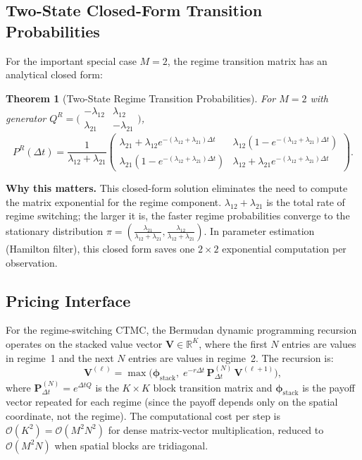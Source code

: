 \documentclass[11pt,a4paper,openany]{book}
\theoremstyle{definition}
\theoremstyle{plain}
\newtheorem{theorem}{Theorem}[chapter]
\theoremstyle{remark}
\newcommand{\1}{\mathbbm{1}}
\newcommand{\R}{\mathbb{R}}
\begin{document}
\subsection{Two-State Closed-Form Transition Probabilities}

For the important special case $M=2$, the regime transition matrix has an analytical closed form:

\begin{theorem}[Two-State Regime Transition Probabilities]
For $M = 2$ with generator $Q^{R} = \bigl(\begin{smallmatrix} -\lambda_{12} & \lambda_{12} \\ \lambda_{21} & -\lambda_{21} \end{smallmatrix}\bigr)$,
\[
\boxed{P^{R}(\Delta t) = \frac{1}{\lambda_{12} + \lambda_{21}} \begin{pmatrix}
\lambda_{21} + \lambda_{12} e^{-(\lambda_{12}+\lambda_{21})\Delta t} & \lambda_{12}(1 - e^{-(\lambda_{12}+\lambda_{21})\Delta t}) \\[4pt]
\lambda_{21}(1 - e^{-(\lambda_{12}+\lambda_{21})\Delta t}) & \lambda_{12} + \lambda_{21} e^{-(\lambda_{12}+\lambda_{21})\Delta t}
\end{pmatrix}}.
\]
\end{theorem}

\medskip
\noindent\textbf{Why this matters.} This closed-form solution eliminates the need to compute the matrix exponential for the regime component. $\lambda_{12} + \lambda_{21}$ is the total rate of regime switching; the larger it is, the faster regime probabilities converge to the stationary distribution $\pi = (\frac{\lambda_{21}}{\lambda_{12}+\lambda_{21}}, \frac{\lambda_{12}}{\lambda_{12}+\lambda_{21}})$. In parameter estimation (Hamilton filter), this closed form saves one $2 \times 2$ exponential computation per observation.

\subsection{Pricing Interface}

For the regime-switching CTMC, the Bermudan dynamic programming recursion operates on the stacked value vector $\mathbf{V} \in \R^{K}$, where the first $N$ entries are values in regime~1 and the next $N$ entries are values in regime~2. The recursion is:
\[
\mathbf{V}^{(\ell)} = \max\bigl(\boldsymbol{\phi}_{\text{stack}}, \; e^{-r \Delta t} \,\mathbf{P}_{\Delta t}^{(N)} \,\mathbf{V}^{(\ell+1)}\bigr),
\]
where $\mathbf{P}_{\Delta t}^{(N)} = e^{\Delta t Q}$ is the $K \times K$ block transition matrix and $\boldsymbol{\phi}_{\text{stack}}$ is the payoff vector repeated for each regime (since the payoff depends only on the spatial coordinate, not the regime). The computational cost per step is $\mathcal{O}(K^{2}) = \mathcal{O}(M^{2} N^{2})$ for dense matrix-vector multiplication, reduced to $\mathcal{O}(M^{2} N)$ when spatial blocks are tridiagonal.
\end{document}
